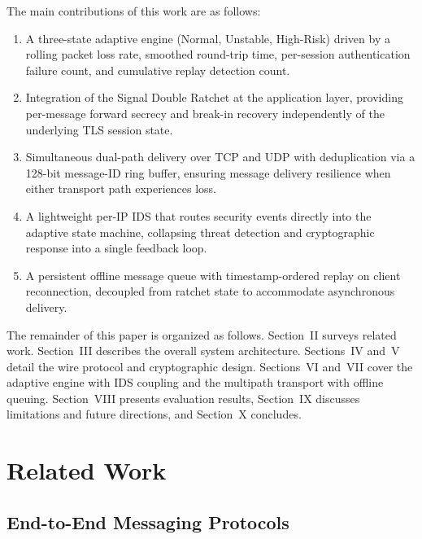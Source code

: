 \documentclass[conference]{IEEEtran}
\begin{document}
The main contributions of this work are as follows:
\begin{enumerate}
    \item A three-state adaptive engine (Normal, Unstable, High-Risk) driven by a
          rolling packet loss rate, smoothed round-trip time, per-session authentication
          failure count, and cumulative replay detection count.
    \item Integration of the Signal Double Ratchet at the application layer, providing
          per-message forward secrecy and break-in recovery independently of the
          underlying TLS session state.
    \item Simultaneous dual-path delivery over TCP and UDP with deduplication via a
          128-bit message-ID ring buffer, ensuring message delivery resilience when
          either transport path experiences loss.
    \item A lightweight per-IP IDS that routes security events directly into the
          adaptive state machine, collapsing threat detection and cryptographic response
          into a single feedback loop.
    \item A persistent offline message queue with timestamp-ordered replay on client
          reconnection, decoupled from ratchet state to accommodate asynchronous delivery.
\end{enumerate}

The remainder of this paper is organized as follows. Section~II surveys related work.
Section~III describes the overall system architecture. Sections~IV and~V detail the
wire protocol and cryptographic design. Sections~VI and~VII cover the adaptive engine
with IDS coupling and the multipath transport with offline queuing. Section~VIII
presents evaluation results, Section~IX discusses limitations and future directions,
and Section~X concludes.

\section{Related Work}

\subsection{End-to-End Messaging Protocols}
\end{document}
